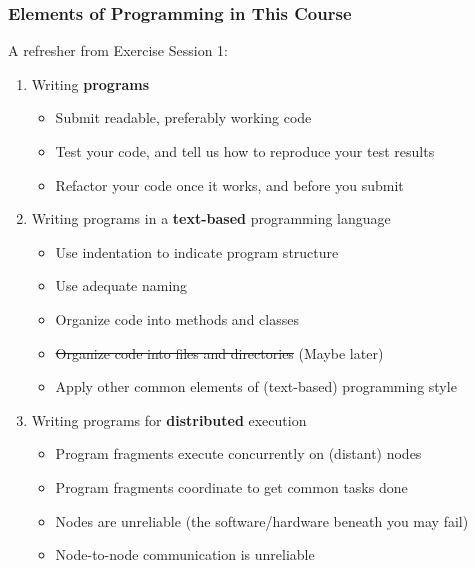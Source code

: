 \begin{frame}

\frametitle{Elements of Programming in This Course}

A refresher from Exercise Session 1:

\begin{enumerate}

\item Writing \textbf{programs}

\begin{itemize}

\footnotesize

\item Submit readable, preferably working code

\item Test your code, and tell us how to reproduce your test results

\item Refactor your code once it works, and before you submit

\end{itemize}

\item Writing programs in a \textbf{text-based} programming language

\begin{itemize}

\footnotesize

\item Use indentation to indicate program structure

\item Use adequate naming

\item Organize code into methods and classes

\item \sout{Organize code into files and directories} (Maybe later)

\item Apply other common elements of (text-based) programming style

\end{itemize}

\item Writing programs for \textbf{distributed} execution

\begin{itemize}

\footnotesize

\item Program fragments execute concurrently on (distant) nodes

\item Program fragments coordinate to get common tasks done

\item Nodes are unreliable (the software/hardware beneath you may fail)

\item Node-to-node communication is unreliable

\end{itemize}

\end{enumerate}

\end{frame}
